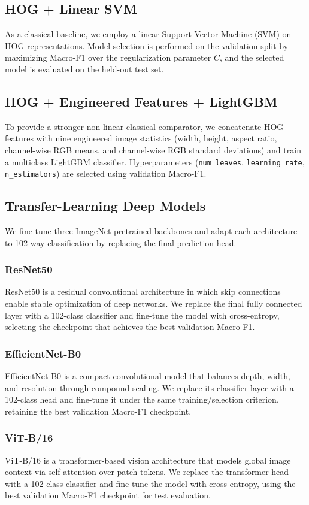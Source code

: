 \documentclass[11pt]{article}
\begin{document}
\subsection{HOG + Linear SVM}
As a classical baseline, we employ a linear Support Vector Machine (SVM) on HOG representations. Model selection is performed on the validation split by maximizing Macro-F1 over the regularization parameter $C$, and the selected model is evaluated on the held-out test set.

\subsection{HOG + Engineered Features + LightGBM}
To provide a stronger non-linear classical comparator, we concatenate HOG features with nine engineered image statistics (width, height, aspect ratio, channel-wise RGB means, and channel-wise RGB standard deviations) and train a multiclass LightGBM classifier. Hyperparameters (\texttt{num\_leaves}, \texttt{learning\_rate}, \texttt{n\_estimators}) are selected using validation Macro-F1.

\subsection{Transfer-Learning Deep Models}
We fine-tune three ImageNet-pretrained backbones and adapt each architecture to 102-way classification by replacing the final prediction head.

\subsubsection{ResNet50}
ResNet50 is a residual convolutional architecture in which skip connections enable stable optimization of deep networks. We replace the final fully connected layer with a 102-class classifier and fine-tune the model with cross-entropy, selecting the checkpoint that achieves the best validation Macro-F1.

\subsubsection{EfficientNet-B0}
EfficientNet-B0 is a compact convolutional model that balances depth, width, and resolution through compound scaling. We replace its classifier layer with a 102-class head and fine-tune it under the same training/selection criterion, retaining the best validation Macro-F1 checkpoint.

\subsubsection{ViT-B/16}
ViT-B/16 is a transformer-based vision architecture that models global image context via self-attention over patch tokens. We replace the transformer head with a 102-class classifier and fine-tune the model with cross-entropy, using the best validation Macro-F1 checkpoint for test evaluation.
\end{document}

